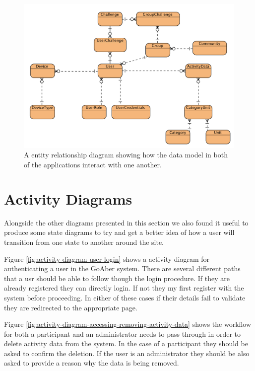 \begin{figure}[H]
\centering
\includegraphics[width=1.0\textwidth]{../design/database/GoAber-ERD.png}
\caption{A entity relationship diagram showing how the data model in both of the applications interact with one another.}
\label{fig:database-design}
\end{figure}

\section{Activity Diagrams}
Alongside the other diagrams presented in this section we also found it useful to produce some state diagrams to try and get a better idea of how a user will transition from one state to another around the site.

Figure \ref{fig:activity-diagram-user-login} shows a activity diagram for authenticating a user in the GoAber system. There are several different paths that a usr should be able to follow though the login procedure. If they are already registered they can directly login. If not they my first register with the system before proceeding. In either of these cases if their details fail to validate they are redirected to the appropriate page.

Figure \ref{fig:activity-diagram-accessing-removing-activity-data} shows the workflow for both a participant and an administrator needs to pass through in order to delete activity data from the system. In the case of a participant they should be asked to confirm the deletion. If the user is an administrator they should be also asked to provide a reason why the data is being removed.

